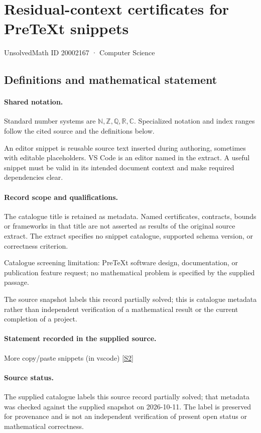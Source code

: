 \documentclass[11pt]{article}
\newcommand{\sref}[2]{\hyperlink{source:#1:#2}{[S#2]}}
\begin{document}
\setcounter{section}{20002166}
\section{Residual-context certificates for PreTeXt snippets}\label{20002167}
{\small\sffamily UnsolvedMath ID 20002167 · Computer Science}
\subsection{Definitions and mathematical statement}

\paragraph{Shared notation.}Standard number systems are $\mathbb N,\mathbb Z,\mathbb Q,\mathbb R,\mathbb C$. Specialized notation and index ranges follow the cited source and the definitions below.


An editor snippet is reusable source text inserted during authoring, sometimes with editable placeholders. VS Code is an editor named in the extract. A useful snippet must be valid in its intended document context and make required dependencies clear.
\paragraph{Record scope and qualifications.}
The catalogue title is retained as metadata. Named certificates, contracts, bounds or frameworks in that title are not asserted as results of the original source extract.
The extract specifies no snippet catalogue, supported schema version, or correctness criterion.

Catalogue screening limitation: PreTeXt software design, documentation, or publication feature request; no mathematical problem is specified by the supplied passage.

The source snapshot labels this record partially solved; this is catalogue metadata rather than independent verification of a mathematical result or the current completion of a project.
\paragraph{Statement recorded in the supplied source.}
More copy/paste snippets (in vscode) \sref{20002167}{2}
\paragraph{Source status.}
The supplied catalogue labels this source record partially solved; that metadata was checked against the supplied snapshot on 2026-10-11. The label is preserved for provenance and is not an independent verification of present open status or mathematical correctness.
\end{document}
